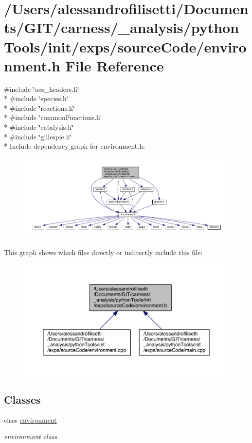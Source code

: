 \hypertarget{a00062}{\section{/\+Users/alessandrofilisetti/\+Documents/\+G\+I\+T/carness/\+\_\+analysis/python\+Tools/init/exps/source\+Code/environment.h File Reference}
\label{a00062}
}
{\ttfamily \#include \char`\"{}acs\+\_\+headers.\+h\char`\"{}}\\*
{\ttfamily \#include \char`\"{}species.\+h\char`\"{}}\\*
{\ttfamily \#include \char`\"{}reactions.\+h\char`\"{}}\\*
{\ttfamily \#include \char`\"{}common\+Functions.\+h\char`\"{}}\\*
{\ttfamily \#include \char`\"{}catalysis.\+h\char`\"{}}\\*
{\ttfamily \#include \char`\"{}gillespie.\+h\char`\"{}}\\*
Include dependency graph for environment.\+h\+:\nopagebreak
\begin{figure}[H]
\begin{center}
\leavevmode
\includegraphics[width=350pt]{a00180}
\end{center}
\end{figure}
This graph shows which files directly or indirectly include this file\+:\nopagebreak
\begin{figure}[H]
\begin{center}
\leavevmode
\includegraphics[width=350pt]{a00181}
\end{center}
\end{figure}
\subsection*{Classes}
\begin{DoxyCompactItemize}
\item 
class \hyperlink{a00013}{environment}
\begin{DoxyCompactList}\small\item\em environment class \end{DoxyCompactList}\end{DoxyCompactItemize}

